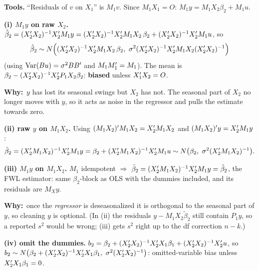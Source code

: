 \documentclass[11pt]{article}
\newcommand{\step}[1]{\par\smallskip\noindent\textbf{\textcolor{qnavy}{#1}}\quad\ignorespaces}
\newcommand{\Why}{\textbf{\textcolor{whyline}{Why:}}\ }
\begin{document}
\begin{solbox}
\step{Tools.} ``Residuals of $v$ on $X_{1}$'' is $M_{1}v$. Since $M_{1}X_{1}=O$:
$M_{1}y = M_{1}X_{2}\beta_{2} + M_{1}u$.

\step{(i) $M_{1}y$ on raw $X_{2}$.}
$\hat\beta_{2} = (X_{2}^{\prime} X_{2})^{-1}X_{2}^{\prime} M_{1}y = (X_{2}^{\prime} X_{2})^{-1}X_{2}^{\prime} M_{1}X_{2}\,\beta_{2} + (X_{2}^{\prime} X_{2})^{-1}X_{2}^{\prime} M_{1}u$, so
\[
  \hat\beta_{2}\sim N\Big((X_{2}^{\prime} X_{2})^{-1}X_{2}^{\prime} M_{1}X_{2}\,\beta_{2},\ \sigma^{2}(X_{2}^{\prime} X_{2})^{-1}X_{2}^{\prime} M_{1}X_{2}(X_{2}^{\prime} X_{2})^{-1}\Big)
\]
(using $\operatorname{Var}(Bu)=\sigma^{2}BB^{\prime}$ and $M_{1}M_{1}^{\prime}=M_{1}$). The mean is
$\beta_{2} - (X_{2}^{\prime} X_{2})^{-1}X_{2}^{\prime} P_{1}X_{2}\beta_{2}$: \textbf{biased} unless $X_{1}^{\prime} X_{2}=O$.
\begin{why}\Why $y$ has lost its seasonal swings but $X_{2}$ has not. The seasonal part of $X_{2}$
no longer moves with $y$, so it acts as noise in the regressor and pulls the estimate towards zero.\end{why}

\step{(ii) raw $y$ on $M_{1}X_{2}$.} Using $(M_{1}X_{2})^{\prime} M_{1}X_{2} = X_{2}^{\prime} M_{1}X_{2}$ and
$(M_{1}X_{2})^{\prime} y = X_{2}^{\prime} M_{1}y$:
\[
  \tilde\beta_{2} = (X_{2}^{\prime} M_{1}X_{2})^{-1}X_{2}^{\prime} M_{1}y = \beta_{2} + (X_{2}^{\prime} M_{1}X_{2})^{-1}X_{2}^{\prime} M_{1}u
  \sim N\big(\beta_{2},\ \sigma^{2}(X_{2}^{\prime} M_{1}X_{2})^{-1}\big).
\]
\step{(iii) $M_{1}y$ on $M_{1}X_{2}$.} $M_{1}$ idempotent $\Rightarrow$ $\bar\beta_{2} = (X_{2}^{\prime} M_{1}X_{2})^{-1}X_{2}^{\prime} M_{1}y = \tilde\beta_{2}$,
the FWL estimator: same $\beta_{2}$-block as OLS with the dummies included, and its residuals are $M_{X}y$.
\begin{why}\Why once the \emph{regressor} is deseasonalized it is orthogonal to the seasonal part of $y$, so
cleaning $y$ is optional. (In (ii) the residuals $y - M_{1}X_{2}\tilde\beta_{2}$ still contain $P_{1}y$, so a
reported $s^{2}$ would be wrong; (iii) gets $s^{2}$ right up to the df correction $n-k$.)\end{why}

\step{(iv) omit the dummies.}
$b_{2} = \beta_{2} + (X_{2}^{\prime} X_{2})^{-1}X_{2}^{\prime} X_{1}\beta_{1} + (X_{2}^{\prime} X_{2})^{-1}X_{2}^{\prime} u$, so
$b_{2}\sim N\big(\beta_{2} + (X_{2}\xT X_{2})^{-1}X_{2}\xT X_{1}\beta_{1},\ \sigma^{2}(X_{2}\xT X_{2})^{-1}\big)$:
omitted-variable bias unless $X_{2}^{\prime} X_{1}\beta_{1}=0$.


\end{solbox}
\end{document}
